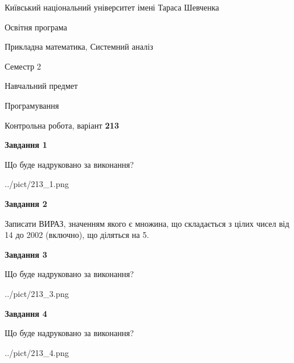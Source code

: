 \documentclass[12pt, ukrainian]{article}
\begin{document}
{{\begin {small}\par
{ \center  Київський національний університет імені Тараса Шевченка \par}
{\parbox {5 cm}{Освітня програма \hfill}{\parbox {8 cm}{Прикладна математика, Системний аналіз \hfill}}\parbox {5 cm}{\hfill Семестр 2}}\par
{\parbox {5 cm} {Навчальний предмет \hfill}\parbox {7 cm}{Програмування \hfill}\parbox {6cm}{\hfill}\par}\vspace{-7pt} \end{small}}{\center Контрольна робота, варіант  \No \textbf
{ 213 }\par}}
{
\begin {large}
{\begin {center}\textbf{Завдання 1}\end {center}}\par
Що буде надруковано за виконання?\par\par
\begin{center}
	{../pict/213_1.png}
\end{center}
\newpage

{\begin {center}\textbf{Завдання 2}\end {center}}\par
Записати ВИРАЗ, значенням якого є множина, що складається з цілих чисел від 14 до 2002 (включно), що діляться на 5.\par
\newpage

{\begin {center}\textbf{Завдання 3}\end {center}}\par
Що буде надруковано за виконання?\par
\begin{center}
	{../pict/213_3.png}
\end{center}
\newpage

{\begin {center}\textbf{Завдання 4}\end {center}}\par
Що буде надруковано за виконання?\par
\begin{center}
	{../pict/213_4.png}
\end{center}
\newpage


\end{large}}
\end{document}
